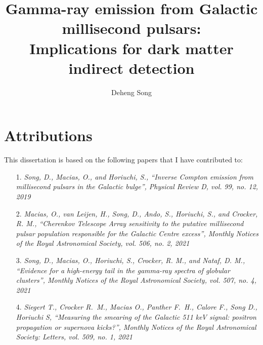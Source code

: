 \documentclass[doublespace,nopageskip]{VTthesis}
\title{Gamma-ray emission from Galactic millisecond pulsars: \\Implications for dark matter indirect detection}
\author{Deheng Song}
\begin{document}
\frontmatter
\maketitle

\chapter*{Attributions}

This dissertation is based on the following papers that I have contributed to:
\begin{itemize}
    \item[1.] \emph{Song, D., Macias, O., and Horiuchi, S., “Inverse Compton emission from millisecond pulsars in the Galactic bulge”, Physical Review D, vol. 99, no. 12, 2019}
    \item[2.] \emph{Macias, O., van Leijen, H., Song, D., Ando, S., Horiuchi, S., and Crocker, R. M., “Cherenkov Telescope Array sensitivity to the putative millisecond pulsar population responsible for the Galactic Centre excess”, Monthly Notices of the Royal Astronomical Society, vol. 506, no. 2, 2021}
    \item[3.] \emph{Song, D., Macias, O., Horiuchi, S., Crocker, R. M., and Nataf, D. M., “Evidence for a high-energy tail in the gamma-ray spectra of globular clusters”, Monthly Notices of the Royal Astronomical Society, vol. 507, no. 4, 2021}
    \item[4.] \emph{Siegert T., Crocker R.~M., Macias O., Panther F.~H., Calore F., Song D., Horiuchi S, “Measuring the smearing of the Galactic 511 keV signal: positron propagation or supernova kicks?”, Monthly Notices of the Royal Astronomical Society: Letters, vol. 509, no. 1, 2021}
\end{itemize}

\tableofcontents

\listoffigures
\listoftables

\end{document}
